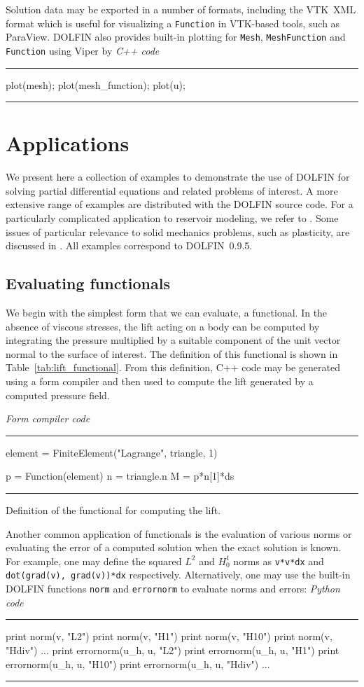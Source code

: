 \documentclass[acmtoms]{acmtrans2m}
\newenvironment{pythoncode}[1]{\center\minipage{#1\textwidth}\footnotesize\hfill\it Python code \rm\vspace{0.1cm}\hrule\renewcommand{\baselinestretch}{0.9}\footnotesize\verbatim}{\endverbatim\hrule\normalsize\endminipage\newline\endcenter}
\newenvironment{cppcode}[1]{\center\minipage{#1\textwidth}\footnotesize\hfill\it C++ code \rm\vspace{0.1cm}\hrule\renewcommand{\baselinestretch}{0.9}\footnotesize\verbatim}{\endverbatim\hrule\normalsize\endminipage\newline\endcenter}
\newenvironment{ffccode}[1]{\center\minipage{#1\textwidth}\footnotesize\hfill\it Form compiler code \rm\vspace{0.1cm}\hrule\renewcommand{\baselinestretch}{0.9}\footnotesize\verbatim}{\endverbatim\hrule\normalsize\endminipage\newline\endcenter}
\newcommand{\emp}[1]{\texttt{#1}}
\newcommand{\dolfin}{DOLFIN}
\begin{document}
Solution data may be exported in a number of formats, including the
VTK~XML format which is useful for visualizing a \emp{Function} in
VTK-based tools, such as ParaView.
\dolfin{} also provides built-in plotting for \emp{Mesh},
\emp{MeshFunction} and \emp{Function} using Viper \cite{www:Viper} by
\begin{cppcode}{0.9}
plot(mesh);
plot(mesh_function);
plot(u);
\end{cppcode}

\section{Applications}
\label{sec:applications}

We present here a collection of examples to demonstrate the use of
\dolfin{} for solving partial differential equations and related
problems of interest. A more extensive range of examples are
distributed with the \dolfin{} source code. For a particularly
complicated application to reservoir modeling, we refer to
. Some issues of particular relevance to solid
mechanics problems, such as plasticity,
are discussed in . All examples correspond to
\dolfin{}~0.9.5.

\subsection{Evaluating functionals}

We begin with the simplest form that we can evaluate, a functional. In
the absence of viscous stresses, the lift acting on a body can be computed
by integrating the pressure multiplied by a suitable component of the
unit vector normal to the surface of interest. The definition of this
functional is shown in Table~\ref{tab:lift_functional}. From this
definition, C++ code may be generated using a form compiler and then
used to compute the lift generated by a computed pressure field.
\begin{table}
\begin{ffccode}{0.9}
element = FiniteElement("Lagrange", triangle, 1)

p = Function(element)
n = triangle.n
M = p*n[1]*ds
\end{ffccode}
\caption{Definition of the functional for computing the lift.}
\label{tab:lift_functional}
\end{table}



Another common application of functionals is the evaluation of various
norms or evaluating the error of a computed solution when the exact
solution is known. For example, one may define the squared $L^{2}$ and
$H^{1}_{0}$ norms as \emp{v*v*dx} and \emp{dot(grad(v), grad(v))*dx}
respectively. Alternatively, one may use the built-in \dolfin{}
functions \emp{norm} and \emp{errornorm} to evaluate norms and errors:
\begin{pythoncode}{0.9}
print norm(v, "L2")
print norm(v, "H1")
print norm(v, "H10")
print norm(v, "Hdiv")
...
print errornorm(u_h, u, "L2")
print errornorm(u_h, u, "H1")
print errornorm(u_h, u, "H10")
print errornorm(u_h, u, "Hdiv")
...
\end{pythoncode}
\end{document}
